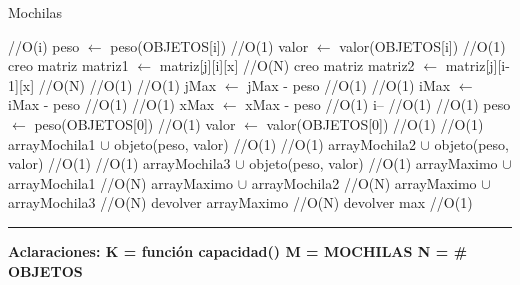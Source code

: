 \begin{algorithm}[H]
\caption{Mochilas}
\begin{algorithmic}[1]
 \hfill //O(i)
\state peso $\gets$ peso(OBJETOS[i]) \hfill //O(1)
\state valor $\gets$ valor(OBJETOS[i]) \hfill //O(1)
\state creo matriz matriz1 $\gets$ matriz[j][i][x] \hfill //O(N)
\state creo matriz matriz2 $\gets$ matriz[j][i-1][x] \hfill //O(N)
 \hfill //O(1)
 \hfill //O(1)
\state jMax $\gets$ jMax - peso \hfill //O(1)
\endif
{} \hfill //O(1)
\state iMax $\gets$ iMax - peso \hfill //O(1)
\endif
{} \hfill //O(1)
\state xMax $\gets$ xMax - peso \hfill //O(1)
\endif
\endif
\state i-- \hfill //O(1)
\endwhile
{} \hfill //O(1)
\state peso $\gets$ peso(OBJETOS[0]) \hfill //O(1)
\state valor $\gets$ valor(OBJETOS[0]) \hfill //O(1)
 \hfill //O(1)
\state arrayMochila1 $\cup$ objeto(peso, valor) \hfill //O(1)
\endif
{} \hfill //O(1)
\state arrayMochila2 $\cup$ objeto(peso, valor) \hfill //O(1)
\endif
{} \hfill //O(1)
\state arrayMochila3 $\cup$ objeto(peso, valor) \hfill //O(1)
\endif
\endif
\state arrayMaximo $\cup$ arrayMochila1 \hfill //O(N)
\state arrayMaximo $\cup$ arrayMochila2 \hfill //O(N)
\state arrayMaximo $\cup$ arrayMochila3 \hfill //O(N)
\state devolver arrayMaximo \hfill //O(N)
\state devolver max \hfill //O(1)
\EndFunction 
\end{algorithmic}
\hrule
{}
\end{algorithm}

\textbf{Aclaraciones:
K = funci\'on capacidad()
M = MOCHILAS
N = \# OBJETOS }